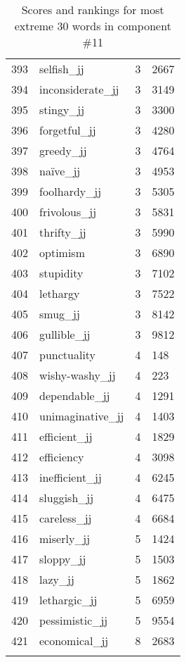 \begin{longtable}[!htbp]{| rlr@{.}l |}
    393 & selfish\_jj & 3 & 2667 \\
    394 & inconsiderate\_jj & 3 & 3149 \\
    395 & stingy\_jj & 3 & 3300 \\
    396 & forgetful\_jj & 3 & 4280 \\
    397 & greedy\_jj & 3 & 4764 \\
    398 & naïve\_jj & 3 & 4953 \\
    399 & foolhardy\_jj & 3 & 5305 \\
    400 & frivolous\_jj & 3 & 5831 \\
    401 & thrifty\_jj & 3 & 5990 \\
    402 & optimism & 3 & 6890 \\
    403 & stupidity & 3 & 7102 \\
    404 & lethargy & 3 & 7522 \\
    405 & smug\_jj & 3 & 8142 \\
    406 & gullible\_jj & 3 & 9812 \\
    407 & punctuality & 4 & 148 \\
    408 & wishy-washy\_jj & 4 & 223 \\
    409 & dependable\_jj & 4 & 1291 \\
    410 & unimaginative\_jj & 4 & 1403 \\
    411 & efficient\_jj & 4 & 1829 \\
    412 & efficiency & 4 & 3098 \\
    413 & inefficient\_jj & 4 & 6245 \\
    414 & sluggish\_jj & 4 & 6475 \\
    415 & careless\_jj & 4 & 6684 \\
    416 & miserly\_jj & 5 & 1424 \\
    417 & sloppy\_jj & 5 & 1503 \\
    418 & lazy\_jj & 5 & 1862 \\
    419 & lethargic\_jj & 5 & 6959 \\
    420 & pessimistic\_jj & 5 & 9554 \\
    421 & economical\_jj & 8 & 2683 \\
    \hline
    \caption{Scores and rankings for most extreme 30 words in component \#11} \\
\end{longtable}
